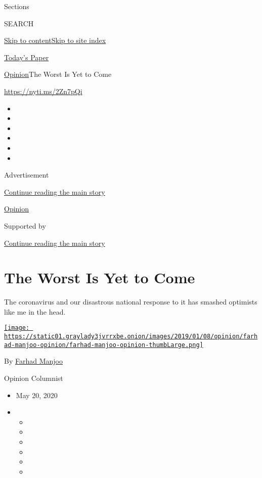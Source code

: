 Sections

SEARCH

\protect\hyperlink{site-content}{Skip to
content}\protect\hyperlink{site-index}{Skip to site index}

\href{https://myaccount.nytimes3xbfgragh.onion/auth/login?response_type=cookie\&client_id=vi}{}

\href{https://www.nytimes3xbfgragh.onion/section/todayspaper}{Today's
Paper}

\href{/section/opinion}{Opinion}\textbar{}The Worst Is Yet to Come

\url{https://nyti.ms/2Zn7pQi}

\begin{itemize}
\item
\item
\item
\item
\item
\item
\end{itemize}

Advertisement

\protect\hyperlink{after-top}{Continue reading the main story}

\href{/section/opinion}{Opinion}

Supported by

\protect\hyperlink{after-sponsor}{Continue reading the main story}

\hypertarget{the-worst-is-yet-to-come}{%
\section{The Worst Is Yet to Come}\label{the-worst-is-yet-to-come}}

The coronavirus and our disastrous national response to it has smashed
optimists like me in the head.

\href{https://www.nytimes3xbfgragh.onion/by/farhad-manjoo}{\texttt{[image: https://static01.graylady3jvrrxbe.onion/images/2019/01/08/opinion/farhad-manjoo-opinion/farhad-manjoo-opinion-thumbLarge.png]}}

By \href{https://www.nytimes3xbfgragh.onion/by/farhad-manjoo}{Farhad
Manjoo}

Opinion Columnist

\begin{itemize}
\item
  May 20, 2020
\item
  \begin{itemize}
  \item
  \item
  \item
  \item
  \item
  \item
  \end{itemize}
\end{itemize}

